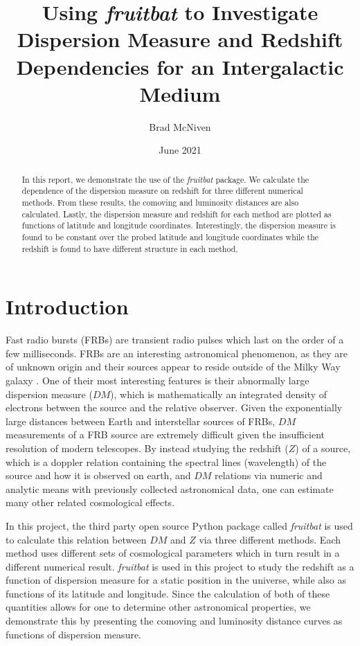 \documentclass{article}
\title{Using {\it fruitbat} to Investigate Dispersion Measure and Redshift Dependencies for an Intergalactic Medium}
\author{Brad McNiven}
\date{June 2021}
\begin{document}
\maketitle

\begin{abstract}
In this report, we demonstrate the use of the {\it fruitbat} package. We calculate the dependence of the dispersion measure on redshift for three different numerical methods. From these results, the comoving and luminosity distances are also calculated. Lastly, the dispersion measure and redshift for each method are plotted as functions of latitude and longitude coordinates. Interestingly, the dispersion measure is found to be constant over the probed latitude and longitude coordinates while the redshift is found to have different structure in each method.
\end{abstract}


\section{Introduction}

Fast radio bursts (FRBs) are transient radio pulses which last on the order of a few milliseconds. FRBs are an interesting astronomical phenomenon, as they are of unknown origin and their sources appear to reside outside of the Milky Way galaxy \cite{Petroff}. One of their most interesting features is their abnormally large dispersion measure ($DM$), which is mathematically an integrated density of electrons between the source and the relative observer. Given the exponentially large distances between Earth and interstellar sources of FRBs, $DM$ measurements of a FRB source are extremely difficult given the insufficient resolution of modern telescopes. By instead studying the redshift ($Z$) of a source, which is a doppler relation containing the spectral lines (wavelength) of the source and how it is observed on earth, and $DM$ relations via numeric and analytic means with previously collected astronomical data, one can estimate many other related cosmological effects.

In this project, the third party open source Python package called {\it fruitbat} \cite{fruitbat} is used to calculate this relation between $DM$ and $Z$ via three different methods. Each method uses different sets of cosmological parameters which in turn result in a different numerical result. {\it fruitbat} is used in this project to study the redshift as a function of dispersion measure for a static position in the universe, while also as functions of its latitude and longitude. Since the calculation of both of these quantities allows for one to determine other astronomical properties, we demonstrate this by presenting the comoving and luminosity distance curves as functions of dispersion measure.
\end{document}
